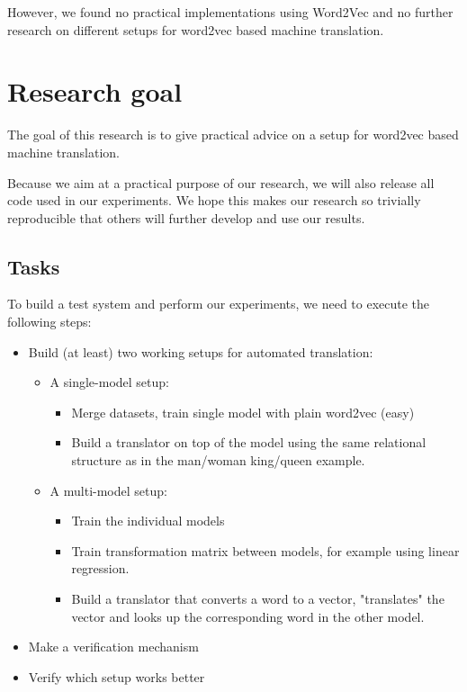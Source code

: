 However, we found no practical implementations using Word2Vec and no further research on different setups for word2vec based machine translation.

\section{Research goal}
The goal of this research is to give practical advice on a setup for word2vec based machine translation.

Because we aim at a practical purpose of our research, we will also release all code used in our experiments. We hope this makes our research so trivially reproducible that others will further develop and use our results.

\subsection{Tasks}
To build a test system and perform our experiments, we need to execute the following steps:

\begin{itemize}
  \item Build (at least) two working setups for automated translation:
    \begin{itemize}
      \item A single-model setup:
      \begin{itemize}
        \item Merge datasets, train single model with plain word2vec (easy)
        \item Build a translator on top of the model using the same relational structure as in the man/woman king/queen example.
      \end{itemize}
      \item A multi-model setup:
      \begin{itemize}
        \item Train the individual models
        \item Train transformation matrix between models, for example using linear regression.
        \item Build a translator that converts a word to a vector, "translates" the vector and looks up the corresponding word in the other model.
      \end{itemize}
    \end{itemize}
  \item Make a verification mechanism
  \item Verify which setup works better
\end{itemize}

